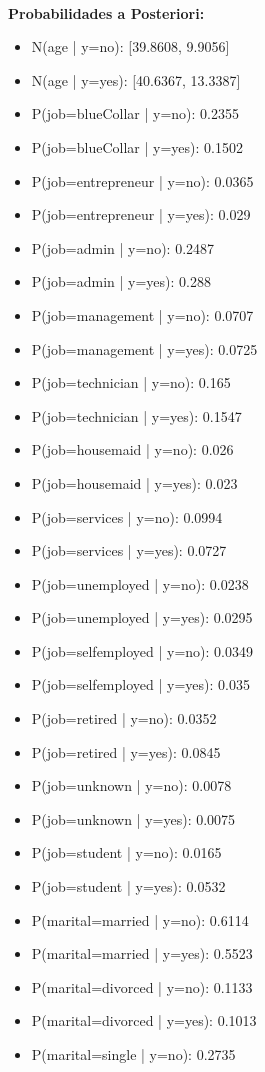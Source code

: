 \documentclass[letterpaper, 10 pt, conference]{ieeeconf}
\begin{document}
\textbf{\\Probabilidades a Posteriori:}
\begin{itemize}
    \item N(age | y=no): [39.8608, 9.9056]
    \item N(age | y=yes): [40.6367, 13.3387]
    \item P(job=blueCollar | y=no): 0.2355
    \item P(job=blueCollar | y=yes): 0.1502
    \item P(job=entrepreneur | y=no): 0.0365
    \item P(job=entrepreneur | y=yes): 0.029
    \item P(job=admin | y=no): 0.2487
    \item P(job=admin | y=yes): 0.288
    \item P(job=management | y=no): 0.0707
    \item P(job=management | y=yes): 0.0725
    \item P(job=technician | y=no): 0.165
    \item P(job=technician | y=yes): 0.1547
    \item P(job=housemaid | y=no): 0.026
	\item P(job=housemaid | y=yes): 0.023
	\item P(job=services | y=no): 0.0994
	\item P(job=services | y=yes): 0.0727
	\item P(job=unemployed | y=no): 0.0238
	\item P(job=unemployed | y=yes): 0.0295
	\item P(job=selfemployed | y=no): 0.0349
	\item P(job=selfemployed | y=yes): 0.035
	\item P(job=retired | y=no): 0.0352
	\item P(job=retired | y=yes): 0.0845
	\item P(job=unknown | y=no): 0.0078
	\item P(job=unknown | y=yes): 0.0075
	\item P(job=student | y=no): 0.0165
	\item P(job=student | y=yes): 0.0532
	\item P(marital=married | y=no): 0.6114
	\item P(marital=married | y=yes): 0.5523
	\item P(marital=divorced | y=no): 0.1133
	\item P(marital=divorced | y=yes): 0.1013
	\item P(marital=single | y=no): 0.2735

\end{itemize}
\end{document}
